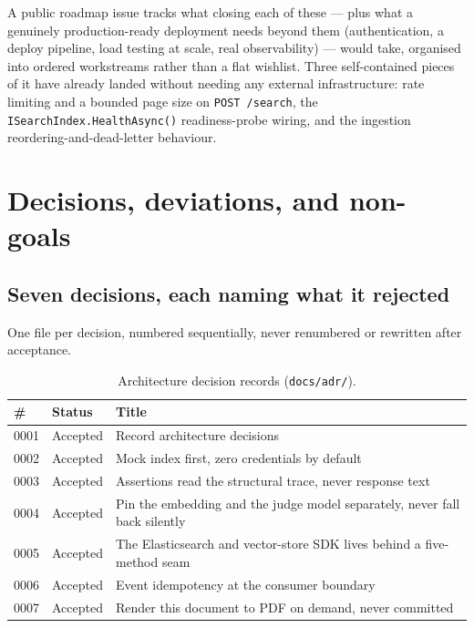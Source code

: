 \documentclass[11pt,a4paper]{article}
\begin{document}
A public roadmap issue tracks what closing each of these --- plus what a
genuinely production-ready deployment needs beyond them (authentication, a
deploy pipeline, load testing at scale, real observability) --- would take,
organised into ordered workstreams rather than a flat wishlist. Three
self-contained pieces of it have already landed without needing any external
infrastructure: rate limiting and a bounded page size on \texttt{POST /search},
the \texttt{ISearchIndex.HealthAsync()} readiness-probe wiring, and the
ingestion reordering-and-dead-letter behaviour.

\section{Decisions, deviations, and non-goals}

\subsection{Seven decisions, each naming what it rejected}

One file per decision, numbered sequentially, never renumbered or rewritten
after acceptance.

\begin{table}[htbp]
\centering
\caption{Architecture decision records (\texttt{docs/adr/}).}
\begin{tabularx}{\linewidth}{@{}llX@{}}
\toprule
\textbf{\#} & \textbf{Status} & \textbf{Title} \\
\midrule
0001 & Accepted & Record architecture decisions \\
0002 & Accepted & Mock index first, zero credentials by default \\
0003 & Accepted & Assertions read the structural trace, never response text \\
0004 & Accepted & Pin the embedding and the judge model separately, never fall back silently \\
0005 & Accepted & The Elasticsearch and vector-store SDK lives behind a five-method seam \\
0006 & Accepted & Event idempotency at the consumer boundary \\
0007 & Accepted & Render this document to PDF on demand, never committed \\
\bottomrule
\end{tabularx}
\end{table}
\end{document}
